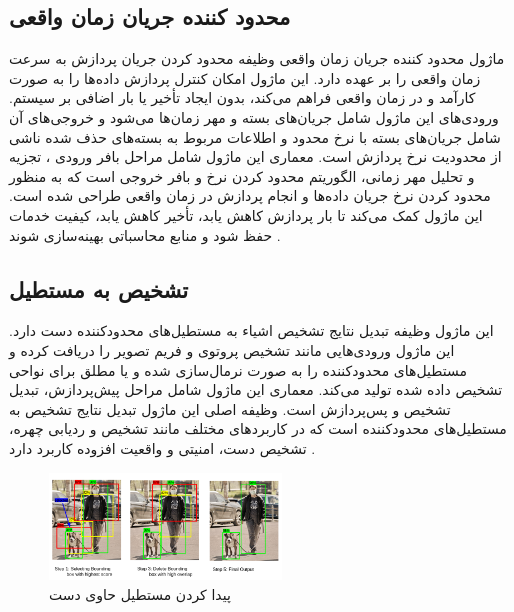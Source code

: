 \subsection{محدود کننده جریان زمان واقعی\protect{}}
ماژول محدود کننده جریان زمان واقعی وظیفه محدود کردن جریان پردازش به سرعت زمان واقعی را بر عهده دارد. این ماژول امکان کنترل پردازش داده‌ها را به صورت کارآمد و در زمان واقعی فراهم می‌کند، بدون ایجاد تأخیر یا بار اضافی 
بر سیستم. ورودی‌های این ماژول شامل جریان‌های بسته و مهر زمان‌ها  می‌شود و خروجی‌های آن شامل جریان‌های بسته با نرخ محدود و اطلاعات مربوط به 
بسته‌های حذف شده ناشی از محدودیت نرخ پردازش است. معماری این ماژول شامل مراحل بافر ورودی  ، تجزیه و تحلیل مهر زمانی، الگوریتم محدود کردن نرخ  و
بافر خروجی است که به منظور محدود کردن نرخ جریان داده‌ها و انجام پردازش در زمان واقعی طراحی شده است. این ماژول کمک می‌کند تا بار پردازش کاهش یابد، تأخیر کاهش یابد، کیفیت خدمات حفظ شود و منابع محاسباتی بهینه‌سازی شوند \cite{zhang2020mediapipe}.


\subsection{تشخیص به مستطیل\protect{}}
این ماژول وظیفه تبدیل نتایج تشخیص اشیاء به مستطیل‌های محدودکننده دست دارد. این ماژول ورودی‌هایی مانند تشخیص پروتوی و فریم تصویر را دریافت کرده و مستطیل‌های محدودکننده را به صورت 
نرمال‌سازی شده و یا مطلق برای نواحی تشخیص داده شده تولید می‌کند. معماری این ماژول شامل مراحل  پیش‌پردازش، تبدیل تشخیص و پس‌پردازش است. وظیفه اصلی این ماژول تبدیل نتایج تشخیص به 
مستطیل‌های محدودکننده است که در کاربردهای مختلف مانند تشخیص و ردیابی چهره، تشخیص دست، امنیتی و واقعیت افزوده کاربرد دارد \cite{zhang2020mediapipe}.

\begin{figure}[h]
    \centering
    \includegraphics[width=0.55\textwidth]{bounding_box.png}
    \caption{پیدا کردن مستطیل حاوی دست}
\end{figure}

